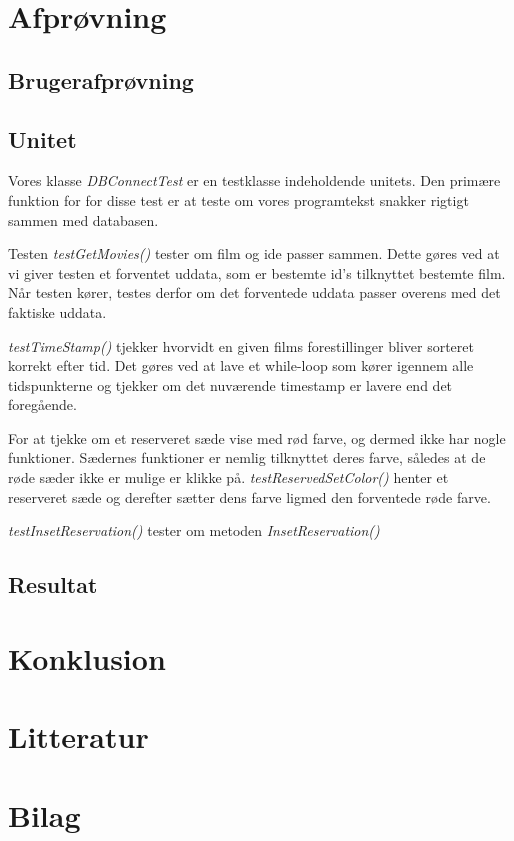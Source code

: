 \documentclass[final]{rapport1}
\begin{document}
\chapter{Afprøvning}

\section{Brugerafprøvning}

\section{Unitet}
Vores klasse \emph{DBConnectTest} er en testklasse indeholdende unitets. Den primære funktion for for disse test er at teste om vores programtekst snakker rigtigt sammen med databasen. 

Testen \emph{testGetMovies()} tester om film og ide passer sammen. Dette gøres ved at vi giver testen et forventet uddata, som er bestemte id's tilknyttet bestemte film. Når testen kører, testes derfor om det forventede uddata passer overens med det faktiske uddata. 

\emph{testTimeStamp()} tjekker hvorvidt en given films forestillinger bliver sorteret korrekt efter tid. Det gøres ved at lave et while-loop som kører igennem alle tidspunkterne og tjekker om det nuværende timestamp er lavere end det foregående.

For at tjekke om et reserveret sæde vise med rød farve, og dermed ikke har nogle funktioner. Sædernes funktioner er nemlig tilknyttet deres farve, således at de røde sæder ikke er mulige er klikke på. \emph{testReservedSetColor()} henter et reserveret sæde og derefter sætter dens farve ligmed den forventede røde farve. 

\emph{testInsetReservation()} tester om metoden \emph{InsetReservation()}



\section{Resultat}


\chapter{Konklusion}

\chapter{Litteratur}

\chapter{Bilag}
\end{document}
